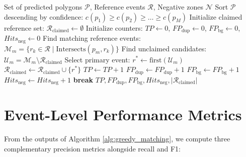 \begin{algorithm}[H]
\caption{Strict Greedy 1-to-1 Event-Matching Algorithm}
\label{alg:greedy_matching}
\begin{algorithmic}[1]
\REQUIRE Set of predicted polygons $\mathcal{P}$, Reference events $\mathcal{R}$, Negative zones $\mathcal{N}$
\STATE Sort $\mathcal{P}$ descending by confidence: $c(p_1) \ge c(p_2) \ge \dots \ge c(p_M)$
\STATE Initialize claimed reference set: $\mathcal{R}_{\text{claimed}} \leftarrow \emptyset$
\STATE Initialize counters: $TP \leftarrow 0$, $FP_{\text{dup}} \leftarrow 0$, $FP_{\text{bg}} \leftarrow 0$, $Hits_{\text{neg}} \leftarrow 0$
    \STATE Find matching reference events: $\mathcal{M}_m = \{r_k \in \mathcal{R} \mid \text{Intersects}(p_m, r_k)\}$
        \STATE Find unclaimed candidates: $\mathcal{U}_m = \mathcal{M}_m \setminus \mathcal{R}_{\text{claimed}}$
            \STATE Select primary event: $r^* \leftarrow \text{first}(\mathcal{U}_m)$
            \STATE $\mathcal{R}_{\text{claimed}} \leftarrow \mathcal{R}_{\text{claimed}} \cup \{r^*\}$
            \STATE $TP \leftarrow TP + 1$ 
        \ELSE
            \STATE $FP_{\text{dup}} \leftarrow FP_{\text{dup}} + 1$ 
        \ENDIF
    \ELSE
        \STATE $FP_{\text{bg}} \leftarrow FP_{\text{bg}} + 1$ 
                \STATE $Hits_{\text{neg}} \leftarrow Hits_{\text{neg}} + 1$ 
                \STATE \textbf{break}
            \ENDIF
        \ENDFOR
    \ENDIF
\ENDFOR
\RETURN $TP, FP_{\text{dup}}, FP_{\text{bg}}, Hits_{\text{neg}}, |\mathcal{R}_{\text{claimed}}|$
\end{algorithmic}
\end{algorithm}

\section{Event-Level Performance Metrics}
\label{sec:exp_metrics}
From the outputs of Algorithm \ref{alg:greedy_matching}, we compute three complementary precision metrics alongside recall and F1:

